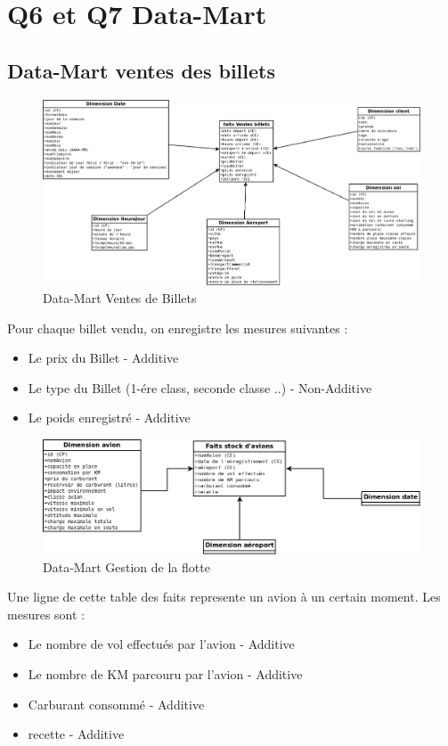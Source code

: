 \documentclass[oneside,13pt,a4paper]{article}
\begin{document}
\section{Q6 et Q7 Data-Mart}

\subsection{Data-Mart ventes des billets}

\begin{figure}[h]
  \centering
  \includegraphics[width=1\textwidth]{img/VenteBillet.png}
  \caption{Data-Mart Ventes de Billets}
\end{figure}

Pour chaque billet vendu, on enregistre les mesures suivantes :
\begin{itemize}
  \item Le prix du Billet - Additive
  \item Le type du Billet (1-ére class, seconde classe ..) - Non-Additive
  \item Le poids enregistré - Additive
\end{itemize}

\begin{figure}[h]
  \centering
  \includegraphics[width=1\textwidth]{img/flotteAvions.png}
  \caption{Data-Mart Gestion de la flotte}
\end{figure}

Une ligne de cette table des faits represente un avion à un certain moment. Les mesures sont :
\begin{itemize}
  \item Le nombre de vol effectués par l'avion - Additive
  \item Le nombre de KM parcouru par l'avion - Additive
  \item Carburant consommé - Additive
  \item recette - Additive
\end{itemize}
\end{document}
